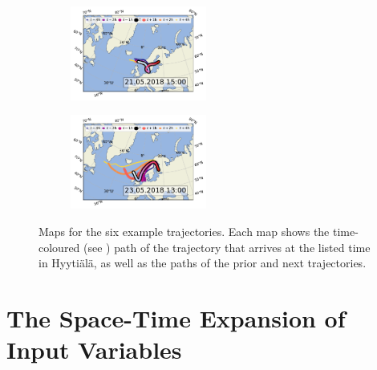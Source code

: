 \begin{figure}[H]
    \begin{subfigure}
        \centering
        \includegraphics[width=0.49\textwidth]{sosaa-data/figures/trajectories/trajectory-21.05.2018:15.00.pdf}
    \end{subfigure}
    \begin{subfigure}
        \centering
        \includegraphics[width=0.49\textwidth]{sosaa-data/figures/trajectories/trajectory-23.05.2018:13.00.pdf}
    \end{subfigure}

    \caption[Maps for the six example trajectories]{Maps for the six example trajectories. Each map shows the time-coloured (see ) path of the trajectory that arrives at the listed time in Hyyti\"al\"a, as well as the paths of the prior and next trajectories.}
    \label{fig:six-trajectories-maps}
\end{figure}

\section{The Space-Time Expansion of Input Variables} \label{txt:space-time-expansion}

